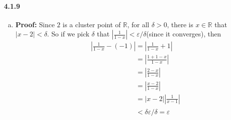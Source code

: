 \documentclass[11pt]{article}
\begin{document}
	\paragraph{4.1.9}
		\begin{enumerate}[(a)]
			\item \textbf{Proof:}
			Since $2$ is a cluster point of $\mathbb{R}$, for all $\delta > 0$, there is $x \in \mathbb{R}$ that $|x - 2| < \delta$. So if we pick $\delta$ that $|\frac{1}{1-x}| < \varepsilon / \delta$(since it converges), then 
			\begin{align}
				&|\frac{1}{1-x}	- (-1)| = |\frac{1}{1-x} + 1|\nonumber\\
				&\phantom{|\frac{1}{1-x}	- (-1)|} = |\frac{1 + 1 - x}{1 - x}|\nonumber\\
				&\phantom{|\frac{1}{1-x}	- (-1)|} = |\frac{2 - x}{1 - x}|\nonumber\\
				&\phantom{|\frac{1}{1-x}	- (-1)|} = |\frac{x - 2}{1 - x}|\nonumber\\
				&\phantom{|\frac{1}{1-x}	- (-1)|} = |x - 2||\frac{1}{x - 1}|\nonumber\\
				&\phantom{|\frac{1}{1-x}	- (-1)|} < \delta\varepsilon / \delta = \varepsilon \nonumber
			\end{align}
			

\end{enumerate}
\end{document}
